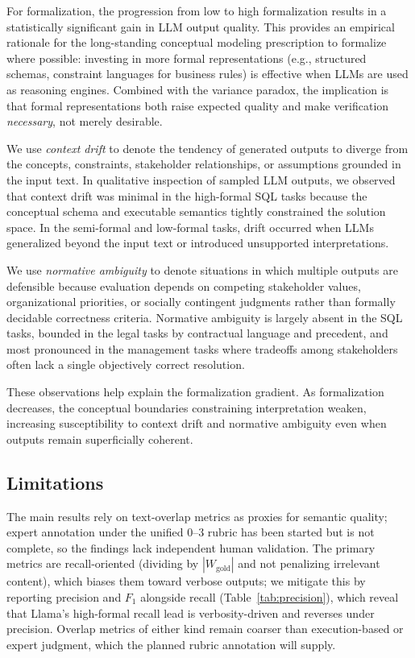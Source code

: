 \documentclass[runningheads]{llncs}
\begin{document}
For formalization, the progression from low to high formalization results in a statistically significant gain in LLM output quality. This provides an empirical rationale for the long-standing conceptual modeling prescription to formalize where possible: investing in more formal representations (e.g., structured schemas, constraint languages for business rules) is effective when LLMs are used as reasoning engines. Combined with the variance paradox, the implication is that formal representations both raise expected quality and make verification \emph{necessary}, not merely desirable.

We use \textit{context drift} to denote the tendency of generated outputs to diverge from the concepts, constraints, stakeholder relationships, or assumptions grounded in the input text. In qualitative inspection of sampled LLM outputs, we observed that context drift was minimal in the high-formal SQL tasks because the conceptual schema and executable semantics tightly constrained the solution space. In the semi-formal and low-formal tasks, drift occurred when LLMs generalized beyond the input text or introduced unsupported interpretations.

We use \textit{normative ambiguity} to denote situations in which multiple outputs are defensible because evaluation depends on competing stakeholder values, organizational priorities, or socially contingent judgments rather than formally decidable correctness criteria. Normative ambiguity is largely absent in the SQL tasks, bounded in the legal tasks by contractual language and precedent, and most pronounced in the management tasks where tradeoffs among stakeholders often lack a single objectively correct resolution.

These observations help explain the formalization gradient. As formalization decreases, the conceptual boundaries constraining interpretation weaken, increasing susceptibility to context drift and normative ambiguity even when outputs remain superficially coherent.

\subsection{Limitations}
\label{sec:limitations}

The main results rely on text-overlap metrics as proxies for semantic quality; expert annotation under the unified $0$--$3$ rubric has been started but is not complete, so the findings lack independent human validation. The primary metrics are recall-oriented (dividing by $|W_{\text{gold}}|$ and not penalizing irrelevant content), which biases them toward verbose outputs; we mitigate this by reporting precision and $F_1$ alongside recall (Table~\ref{tab:precision}), which reveal that Llama's high-formal recall lead is verbosity-driven and reverses under precision. Overlap metrics of either kind remain coarser than execution-based or expert judgment, which the planned rubric annotation will supply.
\end{document}
